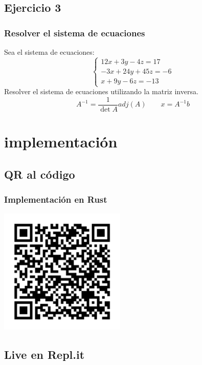 \documentclass{beamer}
\begin{document}
    \subsection{Ejercicio 3}
        \begin{frame}
            \frametitle{Resolver el sistema de ecuaciones}
            Sea el sistema de ecuaciones:
            $$
            \begin{cases}
                12x + 3y - 4z = 17 \\
                -3x + 24y + 45z = -6 \\
                x + 9y - 6z = -13
            \end{cases}
            $$
            Resolver el sistema de ecuaciones utilizando la matriz inversa.
            $$
                A^{-1} = \frac{1}{\det{A}}adj(A)\qquad x = A^{-1}b
            $$
        \end{frame}

    \section{implementación}
    \subsection{QR al código}
    \begin{frame}
        \frametitle{Implementación en Rust}
        \begin{center}
            \includegraphics[width=170pt]{images/QR_rust_implementation.png}
        \end{center}
    \end{frame}
    \subsection{Live en Repl.it}
\end{document}
